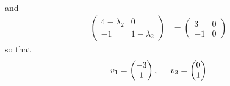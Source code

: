 \documentclass{article}
\begin{document}
\begin{itemize}
\begin{itemize}
\begin{align*}
        \end{align*}
        and
        \begin{align*}
            \begin{pmatrix}
                4 - \lambda_2 & 0\\
                -1 & 1 - \lambda_2
            \end{pmatrix} &= \begin{pmatrix}
                3 & 0\\
                -1 & 0
            \end{pmatrix}
        \end{align*}
        so that
        \[v_1 = \begin{pmatrix}
            -3\\
            1
        \end{pmatrix}, \hspace{0.5cm} v_2 = \begin{pmatrix}
            0\\
            1
        \end{pmatrix}\]
       

\end{itemize}
\end{itemize}
\end{document}
